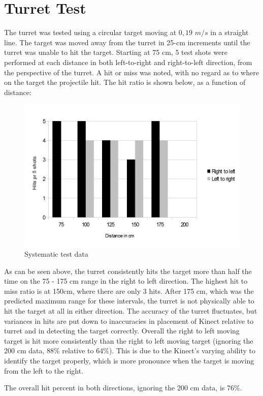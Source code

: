 \section{Turret Test}
The turret was tested using a circular target moving at $0,19$ $m/s$ in a straight line. 
The target was moved away from the turret in 25-cm increments until the turret was unable to hit the target. Starting at 75 cm, 5 test shots were performed at each distance in both left-to-right and right-to-left direction, from the perspective of the turret. A hit or miss was noted, with no regard as to where on the target the projectile hit. The hit ratio is shown below, as a function of distance:

\begin{figure}[hbtp]
	\includegraphics[scale=0.5]{img/test.png}
	\caption{Systematic test data}
	\label{systest}
\end{figure}

As can be seen above, the turret consistently hits the target more than half the time on the 75 - 175 cm range in the right to left direction. The highest hit to miss ratio is at 150cm, where there are only 3 hits. After 175 cm, which was the predicted maximum range for these intervals, the turret is not physically able to hit the target at all in either direction. The accuracy of the turret fluctuates, but variances in hits are put down to inaccuracies in placement of Kinect relative to turret and in detecting the target correctly. Overall the right to left moving target is hit more consistently than the right to left moving target (ignoring the 200 cm data, 88\% relative to 64\%). This is due to the Kinect's varying ability to identify the target properly, which is more pronounce when the target is moving from the left to the right.

The overall hit percent in both directions, ignoring the 200 cm data, is 76\%.
